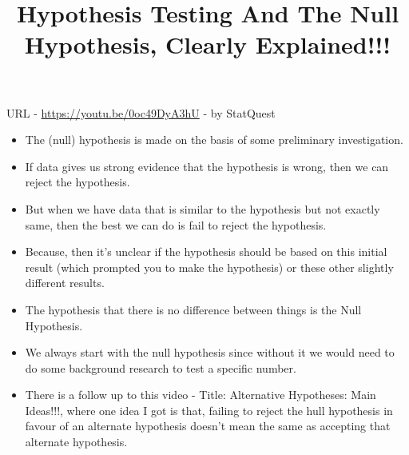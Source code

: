 \documentclass{../template/texnote}
\title{Hypothesis Testing And The Null Hypothesis, Clearly Explained!!!}
\begin{document}
    \maketitle {}
	URL - \url{https://youtu.be/0oc49DyA3hU} - by StatQuest
    \begin{itemize}
        \item The (null) hypothesis is made on the basis of some preliminary investigation.
        \item If data gives us strong evidence that the hypothesis is wrong, then we can reject the hypothesis.
        \item But when we have data that is similar to the hypothesis but not exactly same, then the best we can do is fail 
            to reject the hypothesis.
        \item Because, then it's unclear if the hypothesis should be based on this initial result (which prompted you to make the hypothesis) or 
            these other slightly different results.
        \item The hypothesis that there is no difference between things is the Null Hypothesis.
        \item We always start with the null hypothesis since without it we would need to do some background research to test a specific number.
        \item There is a follow up to this video - Title: Alternative Hypotheses: Main Ideas!!!, where one idea I got is that, failing to reject the hull
            hypothesis in favour of an alternate hypothesis doesn't mean the same as accepting that alternate hypothesis.

    \end{itemize}
    \printbibliography
\end{document}
